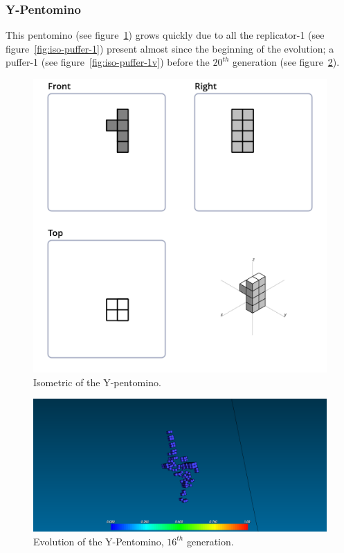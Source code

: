 \subsubsection{Y-Pentomino}
\label{sec:y-pentomino}
This pentomino (see figure~\ref{fig:iso-pent-y}) grows quickly due to all the
replicator-1 (see figure~\ref{fig:iso-puffer-1}) present almost since the
beginning of the evolution; a puffer-1 (see figure~\ref{fig:iso-puffer-1v})
before the $20^{th}$ generation (see figure~\ref{fig:ss-pent:y-16}).

\begin{figure}
	\centering
	\includegraphics[scale=0.3]{iso_diagrams/y.png}
	\caption{Isometric of the Y-pentomino.}
  \label{fig:iso-pent-y}
\end{figure}

\begin{figure}
	\centering
	\includegraphics[scale=0.3]{pentominoes_ss/y_16.png}
	\caption{Evolution of the Y-Pentomino, $16^{th}$ generation.}
	\label{fig:ss-pent:y-16}
\end{figure}

